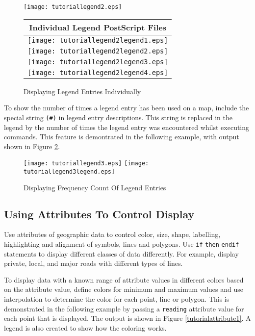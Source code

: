 \begin{figure}[htb]
\texttt{[image: tutoriallegend2.eps]}

\begin{tabular}{|c|}
\hline
Individual Legend PostScript Files \\
\hline
\texttt{[image: tutoriallegend2legend1.eps]} \\
\hline
\texttt{[image: tutoriallegend2legend2.eps]} \\
\hline
\texttt{[image: tutoriallegend2legend3.eps]} \\
\hline
\texttt{[image: tutoriallegend2legend4.eps]} \\
\hline
\end{tabular}

\caption{Displaying Legend Entries Individually}
\label{tutoriallegend2}
\end{figure}

To show the number of times a legend entry has been used on
a map, include the special string \texttt{(\#)} in legend entry descriptions.
This string is replaced in the legend by the number of times the legend entry
was encountered whilst executing commands.
This feature is demontrated in the following example,
with output shown in 
Figure \ref{tutoriallegend3}.



\begin{figure}[htb]
\texttt{[image: tutoriallegend3.eps]}
\texttt{[image: tutoriallegend3legend.eps]}
\caption{Displaying Frequency Count Of Legend Entries}
\label{tutoriallegend3}
\end{figure}

\subsection{Using Attributes To Control Display}

Use attributes of geographic data to control
color, size, shape, labelling, highlighting and alignment of symbols, lines
and polygons.
Use \texttt{if}-\texttt{then}-\texttt{endif}
statements to display different classes of data
differently.  For example, display private, local, and major roads
with different types of lines.

To display data with a known range of attribute values in different
colors based on the attribute value, define colors for minimum and
maximum values and use interpolation to determine the color for
each point, line or polygon.  This is demonstrated in the following
example by passing a \texttt{reading} attribute value for each point
that is displayed.  The output is shown in Figure \ref{tutorialattribute1}.
A legend is also created to show how the coloring works.

